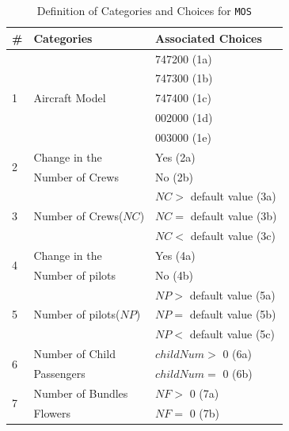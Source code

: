 \documentclass[10pt,journal,compsoc]{IEEEtran}
\begin{document}
\begin{table}[htb]
  \caption{Definition of Categories and Choices for \texttt{MOS}}
  \label{table:categoriesofmos}
  \centering
  \begin{tabular}{lll} \toprule
  \#                &Categories                                                &Associated Choices      \\ \midrule
                    &                                                          &747200  (1a) \\
                    &                                                          &747300 (1b) \\
  1                 &Aircraft Model                                            &747400 (1c) \\
                    &                                                          &002000 (1d) \\
                    &                                                          &003000 (1e) \\ \midrule
  \multirow{2}{*}{2}&Change in the                                             &Yes (2a)    \\
                    &Number of Crews                                           &No (2b)     \\ \midrule
                    &                                                          &$NC >$ default value (3a) \\
  3                 &Number of Crews($NC$)                                     &$NC =$ default value (3b) \\
                    &                                                          &$NC <$ default value (3c) \\ \midrule
  \multirow{2}{*}{4}&Change in the                                             &Yes (4a) \\
                    &Number of pilots                                          &No (4b) \\ \midrule
                    &                                                          &$NP >$ default value (5a) \\
  5                 &Number of pilots($NP$)                                    &$NP =$ default value (5b) \\
                    &                                                          &$NP <$ default value (5c) \\ \midrule
  \multirow{2}{*}{6}&Number of Child                                           &$childNum >$ 0 (6a) \\
                    &Passengers                                                &$childNum =$ 0 (6b) \\ \midrule
  \multirow{2}{*}{7}&Number of Bundles                                         &$NF >$ 0 (7a) \\
                    &Flowers                                                   &$NF =$ 0 (7b) \\ \bottomrule
  \end{tabular}
\end{table}
\end{document}
